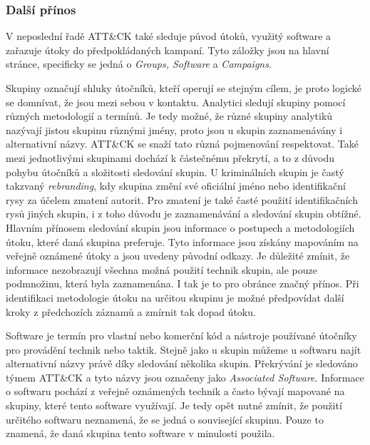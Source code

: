 \subsubsection{Další přínos}
V neposlední řadě ATT\&CK také sleduje původ útoků, využitý software a zařazuje útoky do předpokládaných kampaní.
Tyto záložky jsou na hlavní stránce, specificky se jedná o \textit{Groups, Software} a \textit{Campaigns}.

Skupiny označují shluky útočníků, kteří operují se stejným cílem, je proto logické se domnívat, že jsou mezi sebou v kontaktu.
Analytici sledují skupiny pomocí různých metodologií a termínů.
Je tedy možné, že různé skupiny analytiků nazývají jistou skupinu různými jmény, proto jsou u skupin zaznamenávány i alternativní názvy.
ATT\&CK se snaží tato různá pojmenování respektovat.
Také mezi jednotlivými skupinami dochází k částečnému překrytí, a to z důvodu pohybu útočníků a složitosti sledování skupin.
U kriminálních skupin je častý takzvaný \textit{rebranding}, kdy skupina změní své oficiální jméno nebo identifikační rysy za účelem zmatení autorit.
Pro zmatení je také časté použití identifikačních rysů jiných skupin, i z toho důvodu je zaznamenávání a sledování skupin obtížné.
Hlavním přínosem sledování skupin jsou informace o postupech a metodologiích útoku, které daná skupina preferuje.
Tyto informace jsou získány mapováním na veřejně oznámené útoky a jsou uvedeny původní odkazy.
Je důležité zmínit, že informace nezobrazují všechna možná použití technik skupin, ale pouze podmnožinu, která byla zaznamenána.
I tak je to pro obránce značný přínos.
Při identifikaci metodologie útoku na určitou skupinu je možné předpovídat další kroky z předchozích záznamů a zmírnit tak dopad útoku.\cite{Mitre_groups}


Software je termín pro vlastní nebo komerční kód a nástroje používané útočníky pro provádění technik nebo taktik.
Stejně jako u skupin můžeme u softwaru najít alternativní názvy právě díky sledování několika skupin.
Překrývání je sledováno týmem ATT\&CK a tyto názvy jsou označeny jako \textit{Associated Software}.
Informace o softwaru pochází z veřejně oznámených technik a často bývají mapované na skupiny, které tento software využívají.
Je tedy opět nutné zmínit, že použití určitého softwaru neznamená, že se jedná o související skupinu.
Pouze to znamená, že daná skupina tento software v minulosti použila.\cite{Mitre_software}


